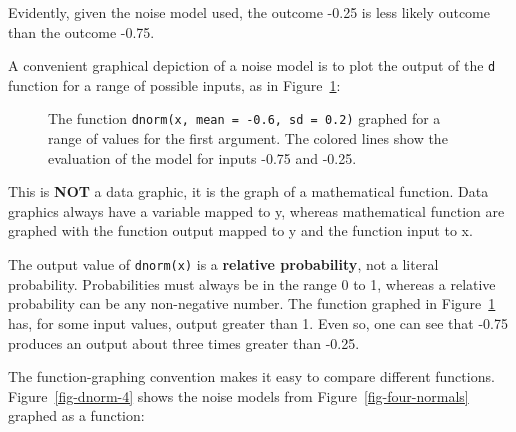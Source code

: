 \documentclass[
  letterpaper,
  DIV=11,
  numbers=noendperiod,
  oneside]{scrartcl}
\begin{document}
Evidently, given the noise model used, the outcome -0.25 is less likely
outcome than the outcome -0.75.

A convenient graphical depiction of a noise model is to plot the output
of the \texttt{d} function for a range of possible inputs, as in
Figure~\ref{fig-dnorm-1}:

\begin{figure}


\caption{\label{fig-dnorm-1}The function
\texttt{dnorm(x,\ mean\ =\ -0.6,\ sd\ =\ 0.2)} graphed for a range of
values for the first argument. The colored lines show the evaluation of
the model for inputs -0.75 and -0.25.}

\end{figure}%

This is \textbf{NOT} a data graphic, it is the graph of a mathematical
function. Data graphics always have a variable mapped to y, whereas
mathematical function are graphed with the function output mapped to y
and the function input to x.

The output value of \texttt{dnorm(x)} is a \textbf{relative
probability}, not a literal probability. Probabilities must always be in
the range 0 to 1, whereas a relative probability can be any non-negative
number. The function graphed in Figure~\ref{fig-dnorm-1} has, for some
input values, output greater than 1. Even so, one can see that -0.75
produces an output about three times greater than -0.25.

The function-graphing convention makes it easy to compare different
functions. Figure~\ref{fig-dnorm-4} shows the noise models from
Figure~\ref{fig-four-normals} graphed as a function:
\end{document}
